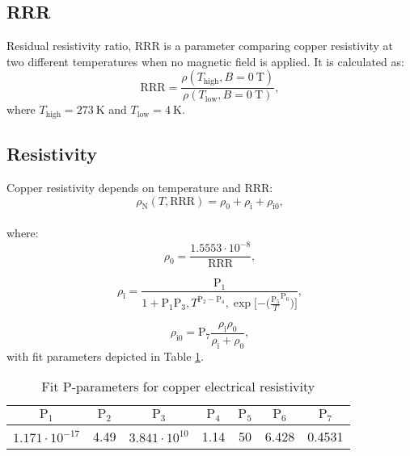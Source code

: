 
\subsection{RRR}
\label{appendix:subsection_rrr_definition}
Residual resistivity ratio, RRR is a parameter comparing copper resistivity at two different temperatures when no magnetic field is applied. It is calculated as: 
\begin{equation}
\text{RRR} = \frac{\rho(T_\text{high}, B=0~\text{T})}{\rho(T_\text{low}, B=0~\text{T})},
\end{equation}
where $T_\text{high}=273~\text{K}$ and $T_\text{low}=4~\text{K}$.

\subsection{Resistivity}
Copper resistivity depends on temperature and RRR:
\begin{equation}
    \rho_\text{N}(T, \text{RRR}) = \rho_\text{0}+\rho_\text{i}+\rho_\text{i0},
\end{equation}
\\
where:
\begin{equation}
    \rho_\text{0} = \frac{1.5553\cdot10^{-8}}{\text{RRR}},
\end{equation}

\begin{equation}
    \rho_\text{i} = \frac{\text{P}_\text{1}}{1+\text{P}_\text{1}  \text{P}_\text{3}, T^{\text{P}_\text{2} - \text{P}_\text{4}}, \exp{[-(\frac{\text{P}_\text{5}}{T}}^{\text{P}_\text{6}})]},
\end{equation}

\begin{equation}
    \rho_\text{i0} = \text{P}_\text{7} \frac{\rho_\text{i} \rho_\text{0}}{\rho_\text{i} + \rho_\text{0}},
\end{equation}
with fit parameters depicted in Table \ref{table:nist_resistivity_parameters}. 

\begin{table}[H]
    \caption{Fit P-parameters for copper electrical resistivity} 
    \vspace{-1.em} 
    \fontsize{10}{10}
    \selectfont 
    \renewcommand{\arraystretch}{1.5}
    \begin{center}
    \begin{tabular}{ ccccccc }  
    \hline
    $\text{P}_1$ & $\text{P}_2$ & $\text{P}_3$ & $\text{P}_4$ & $\text{P}_5$ & $\text{P}_6$ & $\text{P}_7$ \\
    \hline
    $1.171\cdot10^{-17}$ & 4.49 & $3.841\cdot10^{10}$ & 1.14 & 50 & 6.428 & 0.4531 \\
    \hline 
    \end{tabular}
    \end{center}  
     \label{table:nist_resistivity_parameters} 
 \end{table}
 
